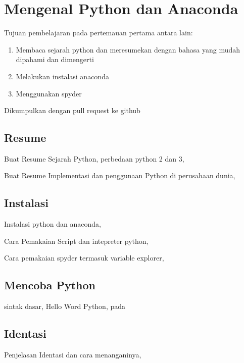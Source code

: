 \chapter{Mengenal Python dan Anaconda}
Tujuan pembelajaran pada pertemauan pertama antara lain:
\begin{enumerate}
\item
Membaca sejarah python dan meresumekan dengan bahasa yang mudah dipahami dan dimengerti
\item
Melakukan instalasi anaconda
\item
Menggunakan spyder
\end{enumerate}
Dikumpulkan dengan pull request ke github

\section{Resume}
Buat Resume Sejarah Python, perbedaan python 2 dan 3,

Buat Resume Implementasi dan penggunaan Python di perusahaan dunia,


\section{Instalasi}
Instalasi python dan anaconda,

Cara Pemakaian Script dan intepreter python,

Cara pemakaian spyder termasuk variable explorer,

\section{Mencoba Python}
sintak dasar, Hello Word Python, pada 


\section{Identasi}
Penjelasan Identasi dan cara menanganinya,



